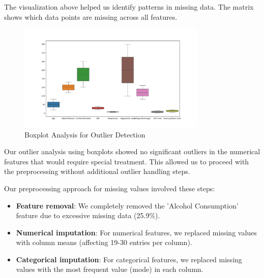 \documentclass[11pt,a4paper]{article}
\begin{document}

The visualization above helped us identify patterns in
missing data. The matrix shows which data points are missing
across all features.

\begin{figure}[H]
    \centering
    \includegraphics[width=0.8\textwidth]{./pictures/outliers.png}
    \caption{Boxplot Analysis for Outlier Detection}
\end{figure}

Our outlier analysis using boxplots showed no significant outliers in
the numerical features that would require special treatment.
This allowed us to proceed with the preprocessing without additional outlier handling steps.

Our preprocessing approach for missing values involved these steps:

\vspace{-0.25cm}
\begin{itemize}
    \vspace{-0.25cm}
    \item \textbf{Feature removal}: We completely removed the 'Alcohol Consumption' feature due to excessive missing data (25.9\%).
          \vspace{-0.25cm}
    \item \textbf{Numerical imputation}: For numerical features, we replaced missing values with column means (affecting 19-30 entries per column).
          \vspace{-0.25cm}
    \item \textbf{Categorical imputation}: For categorical features, we replaced missing values with the most frequent value (mode) in each column.
\end{itemize}
\end{document}
